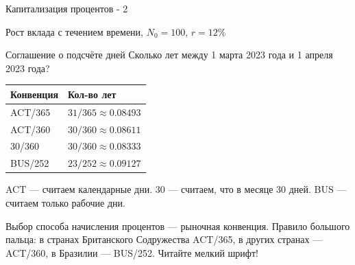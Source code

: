 \documentclass{beamer}
\begin{document}
\begin{frame}{Капитализация процентов - 2}

	\centering
	\scriptsize{Рост вклада с течением времени, $N_0=100$, $r=12\%$}
\end{frame}



\begin{frame}{Соглашение о подсчёте дней}
\justify
Сколько лет между 1 марта 2023 года и 1 апреля 2023 года?

\centering
\begin{tabular}{l|l}
Конвенция & Кол-во лет \\ \hline
ACT/365 & $31/365 \approx 0.08493$ \\
ACT/360 & $30/360 \approx 0.08611$ \\
30/360  & $30/360 \approx 0.08333$ \\
BUS/252 & $23/252 \approx 0.09127$ 
\end{tabular}

\justify
ACT --- считаем календарные дни. 30 --- считаем, что в месяце 30 дней. BUS --- считаем только рабочие дни.

\justify
Выбор способа начисления процентов --- рыночная конвенция. Правило большого пальца: в странах Британского Содружества ACT/365, в других странах --- ACT/360, в Бразилии --- BUS/252. Читайте мелкий шрифт! 
\end{frame}
\end{document}
